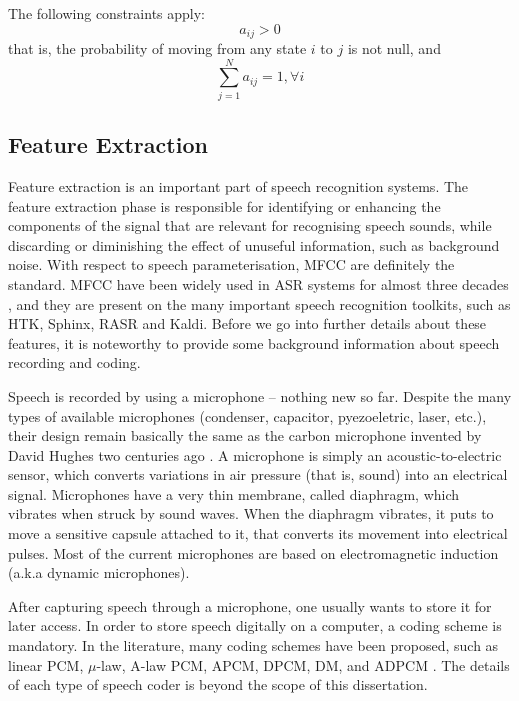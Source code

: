 The following constraints apply:
\begin{equation}
a_{ij} > 0
\end{equation}
that is, the probability of moving from any state $i$ to $j$ is not null, and
\begin{equation}
\sum_{j=1}^{N} a_{ij} = 1, \forall i
\end{equation}

\subsection{Feature Extraction}

Feature extraction is an important part of speech recognition systems. The feature extraction 
phase is responsible for identifying or enhancing the components of the signal that are relevant 
for recognising speech sounds, while discarding or diminishing the effect of unuseful information, 
such as background noise. With respect to speech parameterisation, \ac{MFCC} are definitely the
standard. \ac{MFCC} have been widely used in \ac{ASR} systems for almost three decades \cite{Davis1980}, and 
they are present on the many important speech recognition toolkits, such as \ac{HTK}, Sphinx, \ac{RASR} and Kaldi.
Before we go into further details about these features, it is noteworthy to provide some background information about speech recording and coding.

Speech is recorded by using a microphone -- nothing new so far.
Despite the many types of available microphones (condenser, capacitor, pyezoeletric, laser, etc.), their design
remain basically the same as the carbon microphone invented by David Hughes two centuries ago \cite{Robjohns2010}.
A microphone is simply an acoustic-to-electric sensor, which converts variations in air pressure (that is, sound)
into an electrical signal. Microphones have a very thin membrane, called diaphragm, which vibrates when struck by 
sound waves.  When the diaphragm vibrates, it puts to move a sensitive capsule attached to it, 
that converts its movement into electrical pulses. Most of the current microphones are based on electromagnetic induction (a.k.a dynamic microphones).

After capturing speech through a microphone, one usually wants to store it for later access. In order
to store speech digitally on a computer, a coding scheme is mandatory. In the literature, many coding schemes have
been proposed, such as linear PCM, $\mu$-law, A-law PCM, APCM, DPCM, DM, and ADPCM \cite{Huang2001}. The details of 
each type of speech coder is beyond the scope of this dissertation. 

